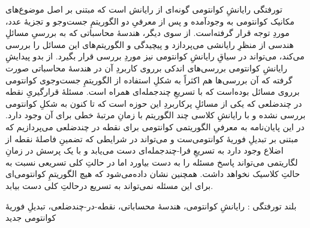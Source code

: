 


\pagestyle{empty}

‌تورفتگی
رایانشِ کوانتومی گونه‌ای از رایانش است که مبتنی بر اصل موضوع‌های مکانیک کوانتومی به وجودآمده و پس از معرفیِ دو الگوریتمِ جست‌وجو و تجزیهٔ عدد، موردِ توجه قرار گرفته‌است.
از سوی دیگر، هندسهٔ محاسباتی که به بررسیِ مسائلِ هندسی از منظرِ رایانشی می‌پردازد و پیچیدگی و الگوریتم‌های این مسائل را بررسی می‌کند، می‌تواند در سیاقِ رایانشِ کوانتومی نیز موردِ بررسی قرار بگیرد.
از بدو پیدایشِ رایانشِ کوانتومی بررسی‌های اندکی برروی کاربردِ آن در هندسهٔ محاسباتی صورت گرفته که آن بررسی‌ها هم اکثراً به شکلِ استفاده از الگوریتمِ جست‌وجوی کوانتومی برروی مسائل بوده‌است که با تسریعِ چندجمله‌ای همراه است.
مسئلهٔ قرارگیریِ نقطه در چندضلعی که یکی از مسائلِ پرکاربردِ این حوزه است که تا کنون به شکلِ کوانتومی بررسی نشده و با رایانشِ کلاسی چند الگوریتم با زمانِ مرتبهٔ خطی برای آن وجود دارد. %
در این پایان‌نامه به معرفیِ الگوریتمی کوانتومی برای نقطه در چندضلعی می‌پردازیم که مبتنی بر تبدیلِ
فوریهٔ کوانتومی‌ست و می‌تواند در  شرایطی که تضمینِ فاصلهٔ نقطه از اضلاع وجود دارد به تسریعِ
فرا-چندجمله‌ای دست می‌یابد و با یک پرسش در زمانِ لگاریتمی می‌تواند پاسخ مسئله را به دست بیاورد
اما در حالتِ کلی تسریعی نسبت به حالتِ کلاسیک نخواهد داشت.
همچنین نشان داده‌می‌شود که هیچ الگوریتمِ کوانتومی‌ای برای این مسئله نمی‌تواند به تسریع درحالتِ کلی دست بیابد.

‌بلند
‌تورفتگی : 
رایانشِ کوانتومی، هندسهٔ محساباتی، نقطه-در-چندضلعی، تبدیلِ فوریهٔ کوانتومی
‌جدید
